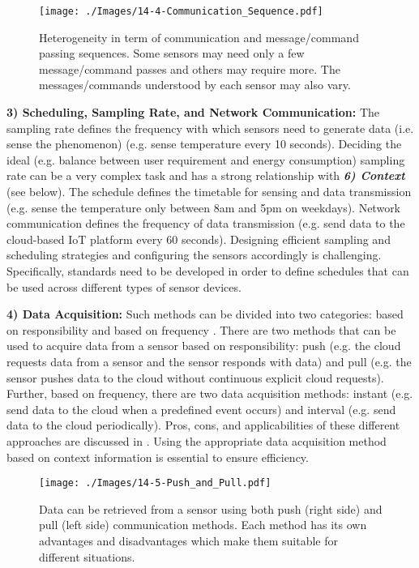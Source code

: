 \documentclass[graybox]{svmult}
\begin{document}
\begin{figure}[h]
 \centering
\texttt{[image: ./Images/14-4-Communication\_Sequence.pdf]}
\caption{Heterogeneity in term of communication and message/command passing sequences. Some sensors may need only a few  message/command passes and others may require more. The messages/commands understood by each sensor may also vary.}
 \label{Figure:Communication_Sequence}
\end{figure}



\textbf{3) Scheduling, Sampling Rate, and Network Communication:} The sampling rate defines the frequency with which sensors need to generate data (i.e. sense the phenomenon) (e.g. sense temperature every 10 seconds). Deciding the ideal (e.g. balance between user requirement and energy consumption) sampling rate can be a very complex task and has a strong relationship with \textbf{\textit{6) Context}} (see below). The schedule defines the timetable for sensing and data transmission (e.g. sense the temperature only between 8am and 5pm on weekdays). Network communication defines the frequency of data transmission (e.g. send data to the cloud-based IoT platform every 60 seconds). Designing efficient sampling and scheduling strategies and configuring the sensors accordingly is challenging. Specifically, standards need to be developed in order to define schedules that can be used across different types of sensor devices.



\textbf{4) Data Acquisition:} Such methods can be divided into two categories: based on responsibility and based on frequency  \cite{ZMP007}. There are two methods that can be used to acquire data from a sensor based on responsibility: push (e.g. the cloud requests data from a sensor and the sensor responds with data) and pull (e.g. the sensor pushes data to the cloud without continuous explicit cloud requests). Further, based on frequency, there are two data acquisition methods: instant (e.g. send data to the cloud when a predefined event occurs) and interval (e.g. send data to the cloud periodically). Pros, cons, and applicabilities of these different approaches are discussed in \cite{ZMP007}. Using the appropriate data acquisition method based on context information is essential to ensure efficiency.


\begin{figure}[h]
 \centering
\texttt{[image: ./Images/14-5-Push\_and\_Pull.pdf]}
\caption{Data can be retrieved from a sensor using both push (right side) and pull (left side) communication methods. Each method has its own advantages and disadvantages which make them suitable for different situations.}
 \label{Figure:Push_and_Pull}
\end{figure}
\end{document}
